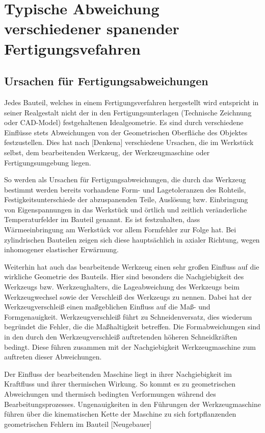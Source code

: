 \section{Typische Abweichung verschiedener spanender Fertigungsvefahren}

\subsection{Ursachen für Fertigungsabweichungen}

Jedes Bauteil, welches in einem Fertigungsverfahren hergestellt wird entspricht in seiner Realgestalt nicht der in den Fertigungsunterlagen (Technische Zeichnung oder CAD-Model) festgehaltenen Idealgeometrie. Es sind durch verschiedene Einflüsse stets Abweichungen von der Geometrischen Oberfläche des Objektes festzustellen. Dies hat nach [Denkena] verschiedene Ursachen, die im Werkstück selbst, dem bearbeitenden Werkzeug, der Werkzeugmaschine oder Fertigungsumgebung liegen. 

So werden als Ursachen für Fertigungsabweichungen, die durch das Werkzeug bestimmt werden bereits vorhandene Form- und Lagetoleranzen des Rohteils, Festigkeitsunterschiede der abzuspanenden Teile, Auslösung bzw. Einbringung von Eigenspannungen in das Werkstück und örtlich und zeitlich veränderliche Temperaturfelder im Bauteil genannt.
Es ist festzuhalten, dass Wärmeeinbringung am Werkstück vor allem Formfehler zur Folge hat. Bei zylindrischen Bauteilen zeigen sich diese hauptsächlich in axialer Richtung, wegen inhomogener elastischer Erwärmung.

Weiterhin hat auch das bearbeitende Werkzeug einen sehr großen Einfluss auf die wirkliche Geometrie des Bauteils. Hier sind besonders die Nachgiebigkeit des Werkzeugs bzw. Werkzeughalters, die Lageabweichung des Werkzeugs beim Werkzeugwechsel sowie der Verschleiß des Werkzeugs zu nennen. Dabei hat der Werkzeugverschleiß einen maßgeblichen Einfluss auf die Maß- und Formgenauigkeit. Werkzeugverschleiß führt zu Schneidenversatz, dies wiederum begründet die Fehler, die die Maßhaltigkeit betreffen. Die Formabweichungen sind in den durch den Werkzeugverschleiß auftretenden höheren Schneidkräften bedingt. Diese führen zusammen mit der Nachgiebigkeit Werkzeugmaschine zum auftreten dieser Abweichungen.

Der Einfluss der bearbeitenden Maschine liegt in ihrer Nachgiebigkeit im Kraftfluss und ihrer thermischen Wirkung. So kommt es zu geometrischen Abweichungen und thermisch bedingten Verformungen während des Bearbeitungsprozesses. Ungenauigkeiten in den Führungen der Werkzeugmaschine führen über die kinematischen Kette der Maschine zu sich fortpflanzenden geometrischen Fehlern im Bauteil [Neugebauer] 

